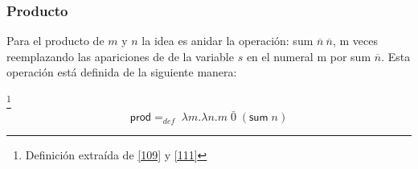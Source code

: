         \subsubsection{Producto}
        Para el producto de $m$ y $n$ la idea es anidar la operación: \textsf{sum} $\overline{n}\ \overline{n}$, m veces reemplazando las apariciones de de la variable $s$ en el numeral m por \textsf{sum} $\overline{n}$. Esta operación está definida de la siguiente manera:

        \begin{definition}\footnote{Definición extraída de \hyperlink{109}{[109]} y  \hyperlink{111}{[111]}}
            $$\textsf{prod} =_{def}  \; \lambda m.\lambda n.m\; \bar{0} \; (\textsf{sum}\;n)$$
        \end{definition}

